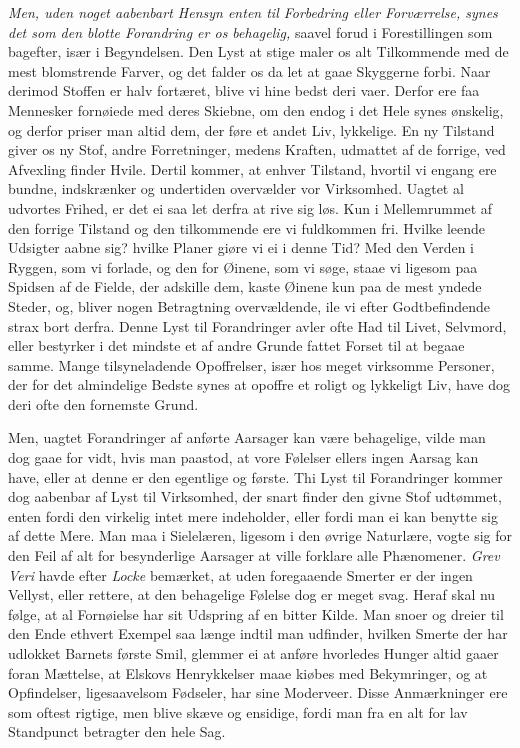 \documentclass[12pt,a4paper]{article}
\newcommand{\opage}[1]{\marginnote{\footnotesize\textit{[#1]}}}
\begin{document}
\opage{220} \emph{Men, uden noget aabenbart Hensyn enten til Forbedring eller Forværrelse, synes det
som den blotte Forandring er os behagelig,} saavel forud i Forestillingen som bagefter,
især i Begyndelsen. Den Lyst at stige maler os alt Tilkommende med de mest blomstrende
Farver, og det falder os da let at gaae Skyggerne forbi. Naar derimod Stoffen er halv
fortæret, blive vi hine bedst deri vaer. Derfor ere faa Mennesker fornøiede med deres
Skiebne, om den endog i det Hele synes ønskelig, og derfor priser man altid dem, der føre
et andet Liv, lykkelige. En ny Tilstand giver os ny Stof, andre Forretninger, medens
Kraften, udmattet af de forrige, ved Afvexling finder Hvile. Dertil kommer, at enhver
Tilstand, hvortil vi engang ere bundne, indskrænker og undertiden overvælder vor
Virksomhed. Uagtet al udvortes Frihed, er det ei saa let derfra at rive sig løs. Kun i
Mellemrummet af den forrige Tilstand og den tilkommende ere vi fuldkommen fri. Hvilke
leende Udsigter aabne sig? hvilke Planer giøre vi ei i denne Tid? Med den Verden i Ryggen,
som vi forlade, og den for Øinene, som vi søge, staae vi ligesom paa Spidsen af de Fielde,
der adskille dem, kaste Øinene kun paa de mest yndede Steder, og, bliver nogen Betragtning
overvældende, ile vi efter Godtbefindende strax bort derfra. Denne Lyst til Forandringer
avler ofte Had til Livet, Selvmord, eller bestyrker i det mindste et af andre
\opage{221} %
Grunde fattet Forset til at begaae samme. Mange tilsyneladende Opoffrelser, især hos meget
virksomme Personer, der for det almindelige Bedste synes at opoffre et roligt og lykkeligt
Liv, have dog deri ofte den fornemste Grund.

Men, uagtet Forandringer af anførte Aarsager kan være behagelige, vilde man dog gaae for
vidt, hvis man paastod, at vore Følelser ellers ingen Aarsag kan have, eller at denne er
den egentlige og første. Thi Lyst til Forandringer kommer dog aabenbar af Lyst til
Virksomhed, der snart finder den givne Stof udtømmet, enten fordi den virkelig intet mere
indeholder, eller fordi man ei kan benytte sig af dette Mere. Man maa i Sielelæren, ligesom
i den øvrige Naturlære, vogte sig for den Feil af alt for besynderlige Aarsager at ville
forklare alle Phænomener. \emph{Grev Veri} havde efter \emph{Locke} bemærket, at uden
foregaaende Smerter er der ingen Vellyst, eller rettere, at den behagelige Følelse dog er
meget svag. Heraf skal nu følge, at al Fornøielse har sit Udspring af en bitter Kilde. Man
snoer og dreier til den Ende ethvert Exempel saa længe indtil man udfinder, hvilken Smerte
der har udlokket Barnets første Smil, glemmer ei at anføre hvorledes Hunger altid gaaer
foran Mættelse, at Elskovs Henrykkelser maae kiøbes med Bekymringer, og at Opfindelser,
ligesaavelsom Fødseler, har sine Moderveer. Disse Anmærkninger ere som
\opage{222} oftest rigtige, men blive skæve og ensidige, fordi man fra en alt for lav Standpunct
betragter den hele Sag.
\end{document}
